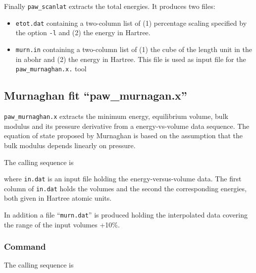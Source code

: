 \documentclass[final,12pt,makeidx,DIV=calc]{article}
\begin{document}
{{{Finally \verb|paw_scanlat| extracts the total energies. It produces
two files:
\begin{itemize}
\item \verb|etot.dat| containing a two-column list of (1) percentage
  scaling specified by the option \verb|-l| and (2) the energy in
  Hartree.  
\item \verb|murn.in| containing a two-column list of (1) the cube of
  the length unit in the in abohr and (2) the energy in Hartree. This
  file is used as input file for the \verb|paw_murnaghan.x.| tool
\end{itemize}




\subsection{Murnaghan fit ``paw\_murnagan.x''}
{\tt paw\_murnaghan.x} extracts the minimum energy, equilibrium
volume, bulk modulus and its pressure derivative from a
energy-vs-volume data sequence. The equation of state proposed by
Murnaghan\cite{murnaghan44_pnas30_244} is based on the assumption that
the bulk modulus depends linearly on pressure.

The calling sequence is

\bigskip{}\bigskip

where {\tt in.dat} is an input file holding the energy-versus-volume
data.  The first column of {\tt in.dat} holds the volumes and the
second the corresponding energies, both given in Hartree atomic
units. 



In addition a file ``{\tt murn.dat}'' is produced holding the
interpolated data covering the range of the input volumes +10\%.


\subsubsection{Command}
The calling sequence is

\bigskip{}
\vspace{0.5cm}

}}}
\end{document}
